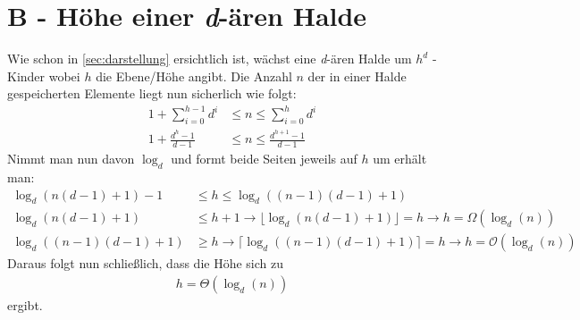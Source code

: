 \documentclass[ngerman]{scrartcl}
\begin{document}
\section{B - Höhe einer \emph{d}-ären Halde}
\label{sec:hoehe}
Wie schon in \autoref{sec:darstellung} ersichtlich ist, wächst eine \emph{d}-ären Halde um $h^d$ - Kinder wobei $h$ die Ebene/Höhe angibt. Die Anzahl $n$ der in einer Halde gespeicherten Elemente liegt nun sicherlich wie folgt:
\begin{align*}
    1+\sum_{i = 0}^{h-1} d^i &\leq n \leq \sum_{i = 0}^{h} d^i\\
    1+\frac{d^h-1}{d-1} &\leq n \leq \frac{d^{h+1}-1}{d-1}
\end{align*}
Nimmt man nun davon $\log_d$ und formt beide Seiten jeweils auf $h$ um erhält man:
\begin{align*}
    \log_d(n(d-1)+1)-1 &\leq h \leq \log_d((n-1)(d-1)+1)\\
    \log_d(n(d-1)+1) &\leq h+1 \rightarrow \lfloor \log_d(n(d-1)+1) \rfloor  = h \rightarrow h = \Omega(\log_d(n))\\
    \log_d((n-1)(d-1)+1) &\geq h \rightarrow \lceil \log_d((n-1)(d-1)+1) \rceil = h \rightarrow h = \mathcal{O}(\log_d(n))
\end{align*}
Daraus folgt nun schließlich, dass die Höhe sich zu
\begin{align*}
    h = \Theta(\log_d(n))
\end{align*}
ergibt.
\end{document}
